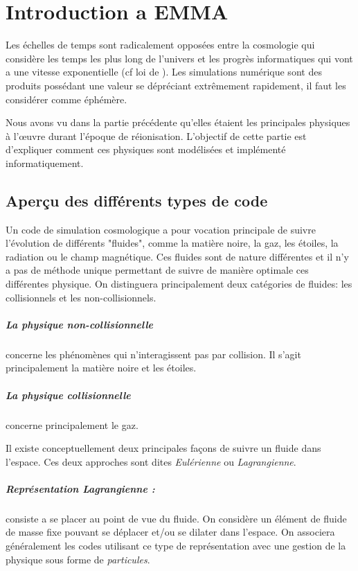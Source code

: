 \chapter{Introduction a EMMA}\label{ch:introduction}
Les échelles de temps sont radicalement opposées entre la cosmologie qui considère les temps les plus long de l'univers et les progrès informatiques qui vont a une vitesse exponentielle (cf loi de \cite{moore1965cramming}). %
Les simulations numérique sont des produits possédant une valeur se dépréciant extrêmement rapidement, il faut les considérer comme éphémère.

Nous avons vu dans la partie précédente qu'elles étaient les principales physiques à l’œuvre durant l'époque de réionisation.
L'objectif de cette partie est d'expliquer comment ces physiques sont modélisées et implémenté informatiquement.


\section{Aperçu des différents types de code}

Un code de simulation cosmologique a pour vocation principale de suivre l'évolution de différents "fluides", comme la matière noire, la gaz, les étoiles, la radiation ou le champ magnétique.
Ces fluides sont de nature différentes et il n'y a pas de méthode unique permettant de suivre de manière optimale ces différentes physique.
On distinguera principalement deux catégories de fluides: les collisionnels et les non-collisionnels.

\paragraph{La physique non-collisionnelle} concerne les phénomènes qui n'interagissent pas par collision.
Il s'agit principalement la matière noire et les étoiles. 

\paragraph{La physique collisionnelle} concerne principalement le gaz.

Il existe conceptuellement deux principales façons de suivre un fluide dans l'espace.
Ces deux approches sont dites \emph{Eulérienne} ou \emph{Lagrangienne}.

\paragraph{Représentation Lagrangienne : } 
consiste a se placer au point de vue du fluide.
On considère un élément de fluide de masse fixe pouvant se déplacer et/ou se dilater dans l'espace.
On associera généralement les codes utilisant ce type de représentation avec une gestion de la physique sous forme de \emph{particules}.

